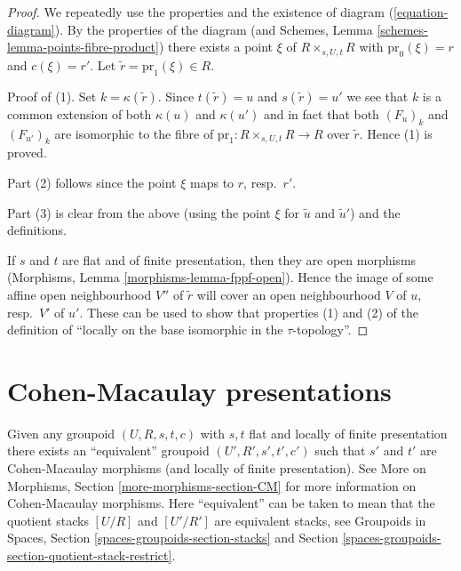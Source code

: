 \begin{proof}
We repeatedly use the properties and the existence of
diagram (\ref{equation-diagram}).
By the properties of the diagram (and
Schemes, Lemma \ref{schemes-lemma-points-fibre-product})
there exists a point $\xi$ of $R \times_{s, U, t} R$
with $\text{pr}_0(\xi) = r$ and $c(\xi) = r'$.
Let $\tilde r = \text{pr}_1(\xi) \in R$.

\medskip\noindent
Proof of (1). Set $k = \kappa(\tilde r)$. Since $t(\tilde r) = u$
and $s(\tilde r) = u'$ we see that $k$ is a common extension
of both $\kappa(u)$ and $\kappa(u')$ and in fact that
both $(F_u)_k$ and $(F_{u'})_k$ are isomorphic to the fibre of
$\text{pr}_1 : R \times_{s, U, t} R \to R$ over $\tilde r$.
Hence (1) is proved.

\medskip\noindent
Part (2) follows since the point $\xi$ maps to $r$, resp.\ $r'$.

\medskip\noindent
Part (3) is clear from the above (using the point $\xi$ for
$\tilde u$ and $\tilde u'$) and the definitions.

\medskip\noindent
If $s$ and $t$ are flat and of finite presentation, then
they are open morphisms (Morphisms, Lemma \ref{morphisms-lemma-fppf-open}).
Hence the image of some affine open neighbourhood $V''$ of $\tilde r$ will
cover an open neighbourhood $V$ of $u$, resp.\ $V'$ of $u'$.
These can be used to show that properties (1) and (2) of the
definition of ``locally on the base isomorphic in the
$\tau$-topology''.
\end{proof}

\section{Cohen-Macaulay presentations}
\label{more-groupoids-section-CM}
Given any groupoid $(U, R, s, t, c)$ with $s, t$ flat and
locally of finite presentation there exists an ``equivalent''
groupoid $(U', R', s', t', c')$ such that $s'$ and $t'$ are
Cohen-Macaulay morphisms (and locally of finite presentation). See
More on Morphisms, Section \ref{more-morphisms-section-CM}
for more information on Cohen-Macaulay morphisms.
Here ``equivalent'' can be taken to mean that the quotient stacks
$[U/R]$ and $[U'/R']$ are equivalent stacks, see
Groupoids in Spaces, Section \ref{spaces-groupoids-section-stacks}
and Section \ref{spaces-groupoids-section-quotient-stack-restrict}.

